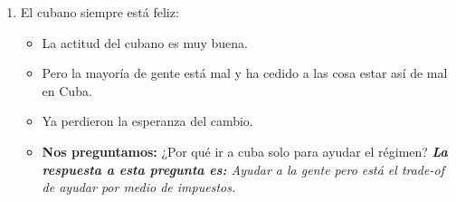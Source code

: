 \begin{enumerate}
    \item El cubano siempre está feliz: 
        \begin{itemize}
            \item La actitud del cubano es muy buena.
            \item Pero la mayoría de gente está mal y ha cedido a las cosa estar así de mal en Cuba.
            \item Ya perdieron la esperanza del cambio.
            \item \textbf{Nos preguntamos:} ¿Por qué ir a cuba solo para ayudar el régimen? \emph{\textbf{La respuesta a esta pregunta es: }Ayudar a la gente pero está el trade-of de ayudar por medio de impuestos.}
        \end{itemize}
\end{enumerate}

